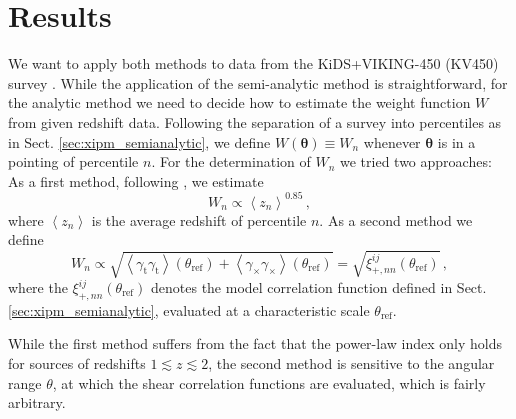 \documentclass[referee]{aa} %
\renewcommand{\[}{\begin{equation}}
\renewcommand{\]}{\end{equation}}
\renewcommand{\rm}{\mathrm}
\def\b#1{\bm{#1}}
\def\la{\left<}
\def\ra{\right>}
\begin{document}

\section{Results}
\label{sec:results}
We want to apply both methods to data from the KiDS+VIKING-450 (KV450) survey \citep{Wright:2018}. While the application of the semi-analytic method is straightforward, for the analytic method we need to decide how to estimate the weight function $W$ from given redshift data. Following the separation of a survey into percentiles as in Sect. \ref{sec:xipm_semianalytic}, we define $W(\b\theta)\equiv W_n$ whenever $\b\theta$ is in a pointing of percentile $n$. For the determination of $W_n$ we tried two approaches:
 As a first method, following \citet{2006APh....26...91V,1997A&A...322....1B}, we estimate 
\[
W_n \propto \la z_n \ra ^{0.85}\, ,
\]
where $\la z_n\ra$ is the average redshift of percentile $n$. As a second method we define \[
W_n \propto \sqrt{ \la\gamma_{\rm{t}}\gamma_{\rm{t}}\ra (\theta_{\rm{ref}}) + \la \gamma_\times\gamma_\times\ra (\theta_{\rm{ref}})} = \sqrt{\xi_{+,nn}^{ij}(\theta_{\rm{ref}})}\, ,
\]
where the $\xi_{+,nn}^{ij}(\theta_{\rm{ref}})$ denotes the model correlation function defined in Sect. \ref{sec:xipm_semianalytic}, evaluated at a characteristic scale $\theta_{\rm{ref}}$.

While the first method suffers from the fact that the power-law index only holds for sources of redshifts $1\lesssim z \lesssim 2$, the second method is sensitive to the angular range $\theta$, at which the shear correlation functions are evaluated, which is fairly arbitrary.
\end{document}

